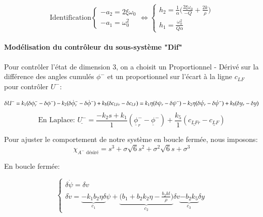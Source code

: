 \documentclass{report}
\begin{document}
\begin{equation*}
    \text{Identification}
    \begin{cases}
        -a_2=2\xi \omega_0 \\
        -a_1 = \omega_0^2
    \end{cases}
    \Leftrightarrow
    \begin{cases}
        h_2 = \frac{1}{\alpha}\big( \frac{2\xi\omega_0}{-Q}+\frac{2k}{\rho})\\
        h_1 = \frac{\omega_0^2}{Q\alpha}
    \end{cases}
\end{equation*}

\paragraph{Modélisation du contrôleur du sous-système "Dif"}
Pour contrôler l'état de dimension 3, on a choisit un Proportionnel - Dérivé
sur la différence des angles cumulés $\phi^-$ 
et un proportionnel sur l'écart à la ligne $c_{LF}$ pour contrôler $U^-$:

\begin{equation*}
    \delta U^- = k_1(\delta \phi^-_r - \delta \phi^-)
    - k_2(\delta \dot{\phi}^-_r - \delta \dot{\phi}^-)
    + k_5(\delta c_{LFr} - \delta c_{LF}) \\
    = k_1 \eta(\delta \psi_r - \delta \psi^-)
    - k_2 \eta(\delta \dot{\psi}_r - \delta \dot{\psi}^-)
    + k_5(\delta y_r - \delta y) \\
\end{equation*}
\begin{equation*}
    \text{En Laplace: }
    \underline{U^-} = \frac{-k_2s + k_1}{1}
    (\underline{\phi}^-_r - \underline{\phi}^-)
    + \frac{k_5}{1}
    (\underline{c_{LFr}} - \underline{c_{LF}})    
\end{equation*}

Pour ajuster le comportement de notre système en boucle fermée, nous 
imposons:
\begin{equation*}
    \chi_{A^- \text{ désiré}} = s^3 + \sigma\sqrt{6}s^2 
    + \sigma^2\sqrt{6}s + \sigma^3 
\end{equation*}

En boucle fermée:

\begin{equation*}
    \begin{cases}
        \delta \dot{\psi} = \delta v \\
        \delta \dot{v} = \underbrace{-k_1b_2\eta\delta}_{c_1} \psi + 
        \underbrace{\big(b_1 + b_2k_2\eta - \frac{b_2kl}{\rho} \big)}_{c_2}\delta v 
        \underbrace{- b_2k_5}_{c_3} \delta y
    \end{cases}
\end{equation*}
\end{document}
